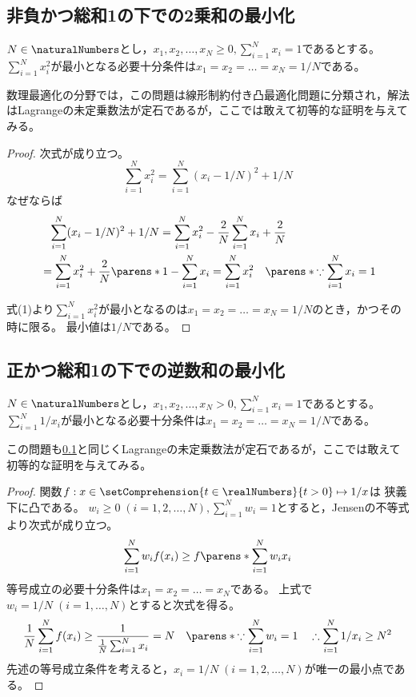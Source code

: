         \subsection{非負かつ総和1の下での2乗和の最小化}
            \label{非負かつ総和1の下での2乗和の最小化}
            \begin{shadebox}
                $N\in\naturalNumbers$とし，$x_1,x_2,\dots,x_N \geq 0,\sum_{i=1}^N x_i = 1$であるとする。
                $\sum_{i=1}^N x_i^2$が最小となる必要十分条件は$x_1 = x_2 = \dots = x_N = 1/N$である。
            \end{shadebox}
            数理最適化の分野では，この問題は線形制約付き凸最適化問題に分類され，解法はLagrangeの未定乗数法が定石であるが，ここでは敢えて初等的な証明を与えてみる。
            \begin{proof}
                次式が成り立つ。
                \[ \sum_{i=1}^N x_i^2 = \sum_{i=1}^N (x_i - 1/N)^2 + 1/N \tag{1} \]
                なぜならば
                \begin{align*}
                    &\phantom{=} \sum_{i=1}^N (x_i - 1/N)^2 + 1/N = \sum_{i=1}^N x_i^2 - \frac{2}{N}\sum_{i=1}^N x_i + \frac{2}{N} \\
                    &= \sum_{i=1}^N x_i^2 + \frac{2}{N}\parens*{1 - \sum_{i=1}^N x_i} = \sum_{i=1}^N x_i^2 \quad \parens*{\because \sum_{i=1}^N x_i = 1}
                \end{align*}
                \par
                式(1)より$\sum_{i=1}^N x_i^2$が最小となるのは$x_1 = x_2 = \dots = x_N = 1/N$のとき，かつその時に限る。
                最小値は$1/N$である。
            \end{proof}
        \subsection{正かつ総和1の下での逆数和の最小化}
            \begin{shadebox}
                $N\in\naturalNumbers$とし，$x_1,x_2,\dots,x_N > 0,\sum_{i=1}^N x_i = 1$であるとする。
                $\sum_{i=1}^N 1/x_i$が最小となる必要十分条件は$x_1 = x_2 = \dots = x_N = 1/N$である。
            \end{shadebox}
            この問題も\ref{非負かつ総和1の下での2乗和の最小化}と同じくLagrangeの未定乗数法が定石であるが，ここでは敢えて初等的な証明を与えてみる。
            \begin{proof}
                関数$f:x\in\setComprehension{t\in\realNumbers}{t>0} \mapsto 1/x$は 狭義下に凸である。
                $w_i\geq 0\;(i=1,2,\dots,N),\sum_{i=1}^N w_i = 1$とすると，Jensenの不等式より次式が成り立つ。
                \[ \sum_{i=1}^N w_i f(x_i) \geq f\parens*{\sum_{i=1}^N w_i x_i} \]
                等号成立の必要十分条件は$x_1 = x_2 = \dots = x_N$である。
                上式で$w_i = 1/N\;(i=1,\dots,N)$とすると次式を得る。
                \[ \frac{1}{N} \sum_{i=1}^N f(x_i) \geq \frac{1}{\frac{1}{N} \sum_{i=1}^N x_i} = N \quad \parens*{\because \sum_{i=1}^N w_i = 1} \quad \therefore \sum_{i=1}^N 1/x_i \geq N^2 \]
                先述の等号成立条件を考えると，$x_i = 1/N\;(i=1,2,\dots,N)$が唯一の最小点である。
            \end{proof}
